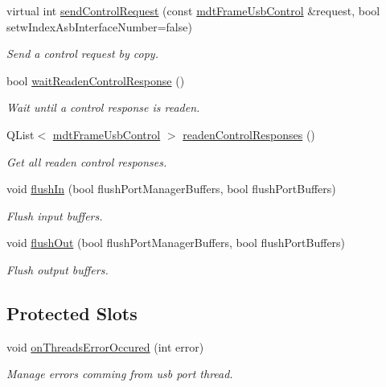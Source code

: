 \begin{DoxyCompactItemize}
virtual int \hyperlink{classmdt_usb_port_manager_aea4a67550effcba13acfc110d6d30c3e}{sendControlRequest} (const \hyperlink{classmdt_frame_usb_control}{mdtFrameUsbControl} \&request, bool setwIndexAsbInterfaceNumber=false)
\begin{DoxyCompactList}\small\item\em Send a control request by copy. \end{DoxyCompactList}\item 
bool \hyperlink{classmdt_usb_port_manager_a34bf0ac118e586bf2547a98964a2230c}{waitReadenControlResponse} ()
\begin{DoxyCompactList}\small\item\em Wait until a control response is readen. \end{DoxyCompactList}\item 
QList$<$ \hyperlink{classmdt_frame_usb_control}{mdtFrameUsbControl} $>$ \hyperlink{classmdt_usb_port_manager_a84c26fee7dfb26290659aa002e0842c6}{readenControlResponses} ()
\begin{DoxyCompactList}\small\item\em Get all readen control responses. \end{DoxyCompactList}\item 
void \hyperlink{classmdt_usb_port_manager_a982256ed17db155e1c95d544683a6dba}{flushIn} (bool flushPortManagerBuffers, bool flushPortBuffers)
\begin{DoxyCompactList}\small\item\em Flush input buffers. \end{DoxyCompactList}\item 
void \hyperlink{classmdt_usb_port_manager_ab723086376175c40635df44adf358985}{flushOut} (bool flushPortManagerBuffers, bool flushPortBuffers)
\begin{DoxyCompactList}\small\item\em Flush output buffers. \end{DoxyCompactList}\end{DoxyCompactItemize}
\subsection*{Protected Slots}
\begin{DoxyCompactItemize}
\item 
void \hyperlink{classmdt_usb_port_manager_ad6cbef2c218efe73fdad6d5f598f743f}{onThreadsErrorOccured} (int error)
\begin{DoxyCompactList}\small\item\em Manage errors comming from usb port thread. \end{DoxyCompactList}\end{DoxyCompactItemize}


